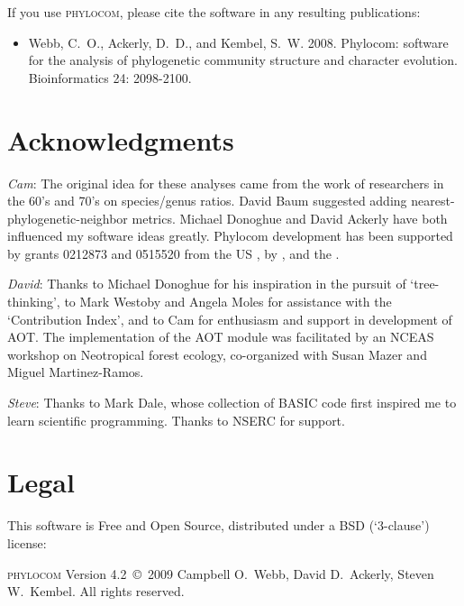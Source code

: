 \documentclass[12pt,letterpaper]{article}
\newcommand{\phylocomversion}{4.2}
\begin{document}
If you use {\scshape phylocom}, please cite the software in any resulting publications:

\begin{raggedright}
\begin{itemize}
 \item[] Webb, C.\ O., Ackerly, D.\ D., and Kembel, S.\ W. 2008. Phylocom: software for the analysis of
phylogenetic community structure and character evolution. Bioinformatics 24: 2098-2100.
\end{itemize}
\end{raggedright}


\section{Acknowledgments}

\textit{Cam}: The original idea for these analyses came from the work
of researchers in the 60's and 70's on species/genus ratios. David
Baum suggested adding nearest-phylogenetic-neighbor metrics. Michael
Donoghue and David Ackerly have both influenced my software ideas
greatly.  Phylocom development has been supported by grants 0212873
and 0515520 from the US ,
by , and the
.


\bigskip \noindent \textit{David}: Thanks to Michael Donoghue for his
inspiration in the pursuit of `tree-thinking', to Mark Westoby and
Angela Moles for assistance with the `Contribution Index', and to Cam
for enthusiasm and support in development of AOT. The implementation
of the AOT module was facilitated by an NCEAS workshop on Neotropical
forest ecology, co-organized with Susan Mazer and Miguel
Martinez-Ramos.

\bigskip \noindent \textit{Steve}: Thanks to Mark Dale, whose collection of BASIC code
first inspired me to learn scientific programming. Thanks to NSERC for support.

\section{Legal}

This software is Free and Open Source, distributed under a BSD
(`3-clause') license:

{\scshape phylocom} Version \phylocomversion~\copyright~2009 Campbell
O.\ Webb, David D.\ Ackerly, Steven W.\ Kembel. All rights reserved.
\end{document}
